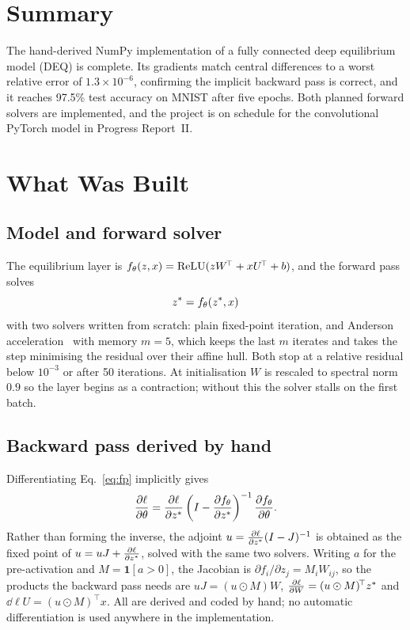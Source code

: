 \documentclass[11pt]{article}
\begin{document}
\makeheader

\section{Summary}

The hand-derived NumPy implementation of a fully connected deep equilibrium
model (DEQ) is complete. Its gradients match central differences to a worst
relative error of $1.3 \times 10^{-6}$, confirming the implicit backward pass
is correct, and it reaches 97.5\% test accuracy on MNIST after five epochs.
Both planned forward solvers are implemented, and the project is on schedule
for the convolutional PyTorch model in Progress Report~II.

\section{What Was Built}

\subsection{Model and forward solver}

The equilibrium layer is $f_{\theta}(z, x) = \operatorname{ReLU}(zW^{\!\top} + xU^{\!\top} + b)$,
and the forward pass solves
\begin{equation}
  z^{*} = f_{\theta}(z^{*}, x)
  \label{eq:fp}
\end{equation}
with two solvers written from scratch: plain fixed-point iteration, and
Anderson acceleration~\cite{anderson1965iterative} with memory $m = 5$, which
keeps the last $m$ iterates and takes the step minimising the residual over
their affine hull. Both stop at a relative residual below $10^{-3}$ or after
50 iterations. At initialisation $W$ is rescaled to spectral norm $0.9$ so the
layer begins as a contraction; without this the solver stalls on the first
batch.

\subsection{Backward pass derived by hand}

Differentiating Eq.~\eqref{eq:fp} implicitly gives
\begin{equation}
  \frac{\partial \ell}{\partial \theta}
  = \frac{\partial \ell}{\partial z^{*}}\left(I - \frac{\partial f_{\theta}}{\partial z^{*}}\right)^{-1}\frac{\partial f_{\theta}}{\partial \theta}.
  \label{eq:implicit}
\end{equation}
Rather than forming the inverse, the adjoint
$u = \frac{\partial \ell}{\partial z^{*}}(I-J)^{-1}$ is obtained as the fixed point of
$u = uJ + \frac{\partial \ell}{\partial z^{*}}$, solved with the same two solvers. Writing $a$ for
the pre-activation and $M = \mathbf{1}[a > 0]$, the Jacobian is
$\partial f_i/\partial z_j = M_i W_{ij}$, so the products the backward pass
needs are $uJ = (u \odot M)W$, $\frac{\partial \ell}{\partial W} = (u \odot M)^{\!\top}z^{*}$ and
$\dd{\ell}{U} = (u \odot M)^{\!\top}x$. All are derived and coded by hand; no
automatic differentiation is used anywhere in the implementation.
\end{document}
